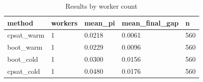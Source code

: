 \begin{table}[t]
\centering
\begin{tabular}{lllll}
\toprule
method & workers & mean\_pi & mean\_final\_gap & n \\
\midrule
cpsat\_warm & 1 & 0.0218 & 0.0061 & 560 \\
boot\_warm & 1 & 0.0229 & 0.0096 & 560 \\
boot\_cold & 1 & 0.0300 & 0.0156 & 560 \\
cpsat\_cold & 1 & 0.0480 & 0.0176 & 560 \\
\bottomrule
\end{tabular}
\caption{Results by worker count}
\label{tab:by-workers}
\end{table}
